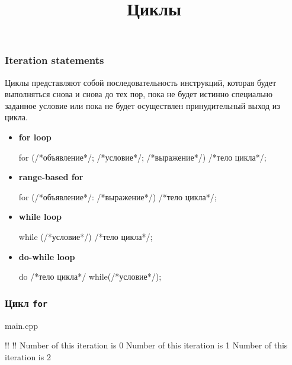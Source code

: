 \documentclass[compress, 8pt]{beamer}
\title{Циклы}
\begin{document}
\frame[plain]{\titlepage}

\begin{frame}[fragile]

    \frametitle{Iteration statements}

    \hfill \break

    Циклы представляют собой последовательность инструкций, которая будет
    выполняться снова и снова до тех пор, пока не будет истинно специально
    заданное условие или пока не будет осуществлен принудительный выход из
    цикла.

    \begin{itemize}

        \item \textbf{for loop}
        \begin{myinplacelisting}[minted language=cpp]
for (/*объявление*/; /*условие*/; /*выражение*/)
{/*тело цикла*/};
        \end{myinplacelisting}

        \item \textbf{range-based for}
        \begin{myinplacelisting}[minted language=cpp]
for (/*объявление*/: /*выражение*/) {/*тело цикла*/};
        \end{myinplacelisting}

        \item \textbf{while loop}
        \begin{myinplacelisting}[minted language=cpp]
while (/*условие*/) {/*тело цикла*/};
        \end{myinplacelisting}

        \item \textbf{do-while loop}
        \begin{myinplacelisting}[minted language=cpp]
do {/*тело цикла*/} while(/*условие*/);
        \end{myinplacelisting}

    \end{itemize}

\end{frame}

\begin{frame}[fragile]

    \frametitle{Цикл \texttt{for}}

        {main.cpp}

    \begin{terminalwindow}
!!
!!
Number of this iteration is 0
Number of this iteration is 1
Number of this iteration is 2
    \end{terminalwindow}

\end{frame}
\end{document}
